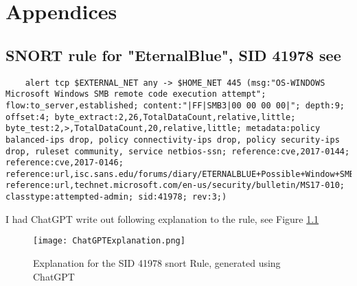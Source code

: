 \documentclass[
	letterpaper, %
	10pt, %
	unnumberedsections, %
	twoside, %
]{APAAssignment}
\begin{document}
\chapter{Appendices}
\begin{appendices}
\section{SNORT rule for "EternalBlue", SID 41978 see\cite{SnortEternalBlue}}\label{app:SnortEternalBlue}

\begin{lstlisting}
	alert tcp $EXTERNAL_NET any -> $HOME_NET 445 (msg:"OS-WINDOWS Microsoft Windows SMB remote code execution attempt"; flow:to_server,established; content:"|FF|SMB3|00 00 00 00|"; depth:9; offset:4; byte_extract:2,26,TotalDataCount,relative,little; byte_test:2,>,TotalDataCount,20,relative,little; metadata:policy balanced-ips drop, policy connectivity-ips drop, policy security-ips drop, ruleset community, service netbios-ssn; reference:cve,2017-0144; reference:cve,2017-0146; reference:url,isc.sans.edu/forums/diary/ETERNALBLUE+Possible+Window+SMB+Buffer+Overflow+0Day/22304/; reference:url,technet.microsoft.com/en-us/security/bulletin/MS17-010; classtype:attempted-admin; sid:41978; rev:3;)
\end{lstlisting}

I had ChatGPT write out following explanation to the rule, see Figure \ref{fig:SnortExaplin}

\begin{figure}[!htp] %
	\centering
	\texttt{[image: ChatGPTExplanation.png]}
	\caption{Explanation for the  SID 41978 snort Rule, generated using ChatGPT }
	\label{fig:SnortExaplin}
\end{figure}





\end{appendices}
\end{document}
